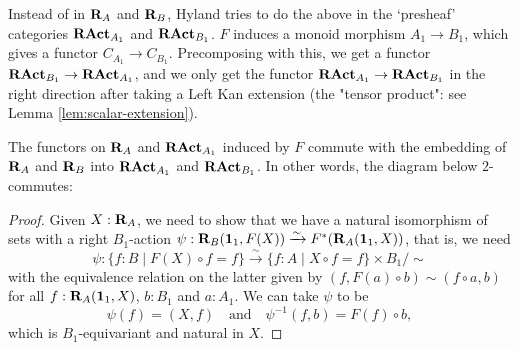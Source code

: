 \begin{remark}
  Instead of in $ \mathbf{R}_A $ and $ \mathbf{R}_B $, Hyland tries to do the above in the `presheaf' categories $ \mathbf{RAct}_{A_1} $ and $ \mathbf{RAct}_{B_1} $. $ F $ induces a monoid morphism $ A_1 \to B_1 $, which gives a functor $ C_{A_1} \to C_{B_1} $. Precomposing with this, we get a functor $ \mathbf{RAct}_{B_1} \to \mathbf{RAct}_{A_1} $, and we only get the functor $ \mathbf{RAct}_{A_1} \to \mathbf{RAct}_{B_1} $ in the right direction after taking a Left Kan extension (the "tensor product": see Lemma \ref{lem:scalar-extension}).
\end{remark}

\begin{lemma}
  The functors on $ \mathbf{R}_A $ and $ \mathbf{RAct}_{A_1} $ induced by $ F $ commute with the embedding of $ \mathbf{R}_A $ and $ \mathbf{R}_B $ into $ \mathbf{RAct}_{A_1} $ and $ \mathbf{RAct}_{B_1} $. In other words, the diagram below $ 2 $-commutes:
  \begin{center}
  \end{center}
\end{lemma}
\begin{proof}
  Given $ X : \mathbf{R}_A $, we need to show that we have a natural isomorphism of sets with a right $ B_1 $-action $ \psi: \mathbf{R}_B(\mathbf 1_1, F(X)) \xrightarrow \sim F^*(\mathbf{R}_A(\mathbf 1_1, X)) $, that is, we need
  \[ \psi: \{ f : B \mid F(X) \circ f = f \} \xrightarrow \sim \{ f : A \mid X \circ f = f \} \times B_1 / \sim \]
  with the equivalence relation on the latter given by $ (f, F(a) \circ b) \sim (f \circ a, b) $ for all $ f : \mathbf{R}_A(\mathbf 1_1, X) $, $ b : B_1 $ and $ a : A_1 $. We can take $ \psi $ to be
  \[ \psi(f) = (X, f) \quad \text{and} \quad \psi^{-1}(f, b) = F(f) \circ b, \]
  which is $ B_1 $-equivariant and natural in $ X $.
\end{proof}

